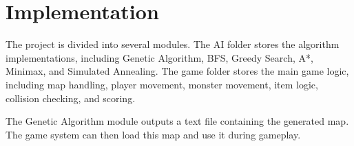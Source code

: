 \section{Implementation}

The project is divided into several modules. The AI folder stores the algorithm implementations, including Genetic Algorithm, BFS, Greedy Search, A*, Minimax, and Simulated Annealing. The game folder stores the main game logic, including map handling, player movement, monster movement, item logic, collision checking, and scoring.

The Genetic Algorithm module outputs a text file containing the generated map. The game system can then load this map and use it during gameplay.
